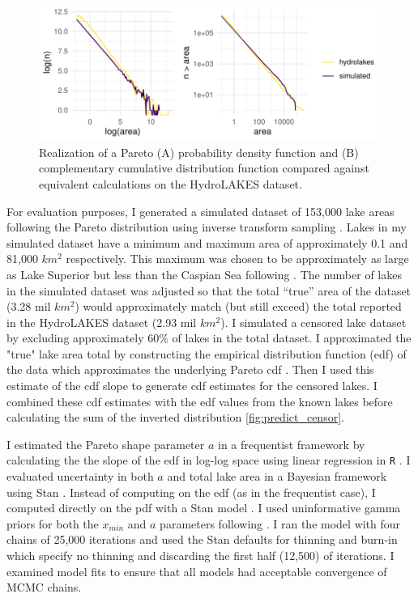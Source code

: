 \documentclass{article}
\begin{document}
\begin{figure}[h]
	\centering
	\includegraphics{figures/pareto_demo-1}
	\caption{Realization of a Pareto (A) probability density function and (B) complementary cumulative distribution function compared against equivalent calculations on the HydroLAKES dataset.}
	\label{fig:pareto_demo}
\end{figure}

For evaluation purposes, I generated a simulated dataset of 153,000 lake areas following the Pareto distribution using inverse transform sampling \citep{newman_power_2005}. Lakes in my simulated dataset have a minimum and maximum area of approximately 0.1 and 81,000 $km^2$ respectively. This maximum was chosen to be approximately as large as Lake Superior but less than the Caspian Sea following \citep{lehnerDevelopmentValidationGlobal2004}. The number of lakes in the simulated dataset was adjusted so that the total “true” area of the dataset (3.28 mil $km^2$) would approximately match (but still exceed) the total reported in the HydroLAKES dataset (2.93 mil $km^2$). I simulated a censored lake dataset by excluding approximately 60\% of lakes in the total dataset. I approximated the "true" lake area total by constructing the empirical distribution function (edf) of the data which approximates the underlying Pareto cdf \citep{newman_power_2005}. Then I used this estimate of the cdf slope to generate cdf estimates for the censored lakes. I combined these cdf estimates with the edf values from the known lakes before calculating the sum of the inverted distribution \ref{fig:predict_censor}.

I estimated the Pareto shape parameter $a$ in a frequentist framework by calculating the the slope of the edf in log-log space using linear regression in \texttt{R} \citep{team2013r}. I evaluated uncertainty in both $a$ and total lake area in a Bayesian framework using Stan \citep{standevelopmentteamStanModelingLanguage2017}. Instead of computing on the edf (as in the frequentist case), I computed directly on the pdf with a Stan model \citep
[See][]{jemma_stachelek_2022_7459227}. I used uninformative gamma priors for both the $x_{min}$ and $a$ parameters following \citet{scollnikCompositeLognormalParetoModels2007}. I ran the model with four chains of 25,000 iterations and used the Stan defaults for thinning and burn-in which specify no thinning and discarding the first half (12,500) of iterations. I examined model fits to ensure that all models had acceptable convergence of MCMC chains.
\end{document}

